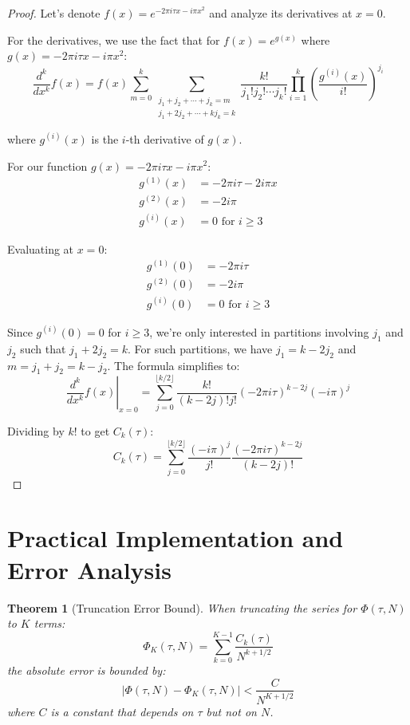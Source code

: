 \documentclass{article}
\newtheorem{theorem}{Theorem}
\begin{document}
\begin{proof}
Let's denote $f(x) = e^{-2\pi i\tau x - i\pi x^2}$ and analyze its derivatives at $x=0$.

For the derivatives, we use the fact that for $f(x) = e^{g(x)}$ where $g(x) = -2\pi i\tau x - i\pi x^2$:
\[
\frac{d^k}{dx^k}f(x) = f(x) \sum_{m=0}^k \sum_{\substack{j_1 + j_2 + \cdots + j_k = m \\ j_1 + 2j_2 + \cdots + kj_k = k}} \frac{k!}{j_1! j_2! \cdots j_k!} \prod_{i=1}^k \left(\frac{g^{(i)}(x)}{i!}\right)^{j_i}
\]

where $g^{(i)}(x)$ is the $i$-th derivative of $g(x)$.

For our function $g(x) = -2\pi i\tau x - i\pi x^2$:
\begin{align*}
g^{(1)}(x) &= -2\pi i\tau - 2i\pi x \\
g^{(2)}(x) &= -2i\pi \\
g^{(i)}(x) &= 0 \text{ for } i \geq 3
\end{align*}

Evaluating at $x=0$:
\begin{align*}
g^{(1)}(0) &= -2\pi i\tau \\
g^{(2)}(0) &= -2i\pi \\
g^{(i)}(0) &= 0 \text{ for } i \geq 3
\end{align*}

Since $g^{(i)}(0) = 0$ for $i \geq 3$, we're only interested in partitions involving $j_1$ and $j_2$ such that $j_1 + 2j_2 = k$. For such partitions, we have $j_1 = k - 2j_2$ and $m = j_1 + j_2 = k - j_2$. The formula simplifies to:
\[
\left.\frac{d^k}{dx^k}f(x)\right|_{x=0} = \sum_{j=0}^{\lfloor k/2 \rfloor} \frac{k!}{(k-2j)! j!} (-2\pi i\tau)^{k-2j} (-i\pi)^j
\]

Dividing by $k!$ to get $C_k(\tau)$:
\[
C_k(\tau) = \sum_{j=0}^{\lfloor k/2 \rfloor}\frac{(-i\pi)^j}{j!}\frac{(-2\pi i\tau)^{k-2j}}{(k-2j)!}
\]
\end{proof}

\section{Practical Implementation and Error Analysis}

\begin{theorem}[Truncation Error Bound]
When truncating the series for $\Phi(\tau, N)$ to $K$ terms:
\[
\Phi_K(\tau, N) = \sum_{k=0}^{K-1} \frac{C_k(\tau)}{N^{k+1/2}}
\]
the absolute error is bounded by:
\[
\left|\Phi(\tau, N) - \Phi_K(\tau, N)\right| < \frac{C}{N^{K+1/2}}
\]
where $C$ is a constant that depends on $\tau$ but not on $N$.
\end{theorem}
\end{document}
